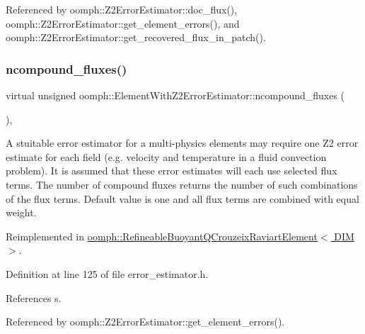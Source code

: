 Referenced by oomph\+::\+Z2\+Error\+Estimator\+::doc\+\_\+flux(), oomph\+::\+Z2\+Error\+Estimator\+::get\+\_\+element\+\_\+errors(), and oomph\+::\+Z2\+Error\+Estimator\+::get\+\_\+recovered\+\_\+flux\+\_\+in\+\_\+patch().

\mbox{\label{classoomph_1_1ElementWithZ2ErrorEstimator_a1c0e819954397f99f8d03a15fecb2e6d}} 
\subsubsection{\texorpdfstring{ncompound\+\_\+fluxes()}{ncompound\_fluxes()}}
{\footnotesize\ttfamily virtual unsigned oomph\+::\+Element\+With\+Z2\+Error\+Estimator\+::ncompound\+\_\+fluxes (\begin{DoxyParamCaption}{ }\end{DoxyParamCaption})\hspace{0.3cm}{\ttfamily [inline]}, {\ttfamily [virtual]}}



A stuitable error estimator for a multi-\/physics elements may require one Z2 error estimate for each field (e.\+g. velocity and temperature in a fluid convection problem). It is assumed that these error estimates will each use selected flux terms. The number of compound fluxes returns the number of such combinations of the flux terms. Default value is one and all flux terms are combined with equal weight. 



Reimplemented in \hyperlink{classoomph_1_1RefineableBuoyantQCrouzeixRaviartElement_a395397240c5745ad7ed66ce6f66b5d99}{oomph\+::\+Refineable\+Buoyant\+Q\+Crouzeix\+Raviart\+Element$<$ D\+I\+M $>$}.



Definition at line 125 of file error\+\_\+estimator.\+h.



References s.



Referenced by oomph\+::\+Z2\+Error\+Estimator\+::get\+\_\+element\+\_\+errors().

\mbox{\label{classoomph_1_1ElementWithZ2ErrorEstimator_af39480835bd3e0f6b2f4f7a9a4044798}} 
